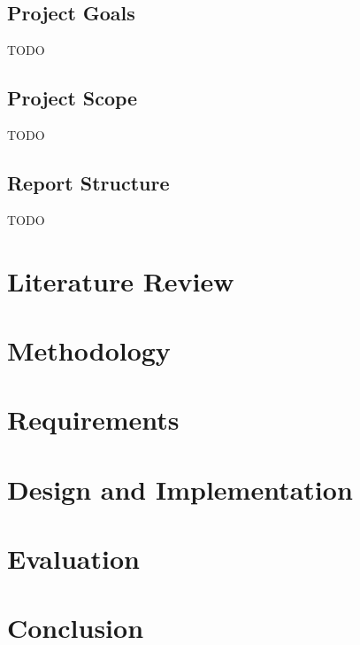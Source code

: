 \documentclass{UoYCSproject}
\begin{document}
\section{Project Goals}
TODO
\section{Project Scope}
TODO
\section{Report Structure}
TODO

\chapter{Literature Review}

\chapter{Methodology}

\chapter{Requirements}

\chapter{Design and Implementation}

\chapter{Evaluation}

\chapter{Conclusion}

\printbibliography
\end{document}

